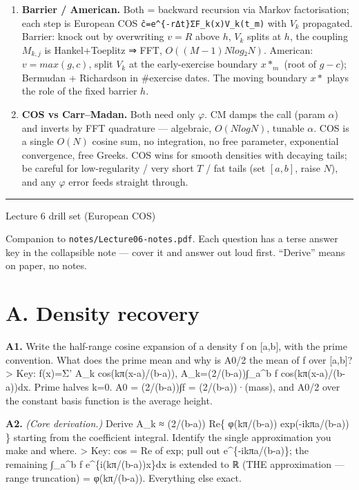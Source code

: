 \documentclass[
  11pt,
]{article}
\begin{document}
\begin{enumerate}
\item
  \textbf{Barrier / American.} Both = backward recursion via Markov
  factorisation; each step is European COS
  \texttt{ĉ=e\^{}\{-rΔt\}Σ\textquotesingle{}F\_k(x)V\_k(t\_m)} with
  \(V_k\) propagated. Barrier: knock out by overwriting \(v=R\) above
  \(h\), \(V_k\) splits at \(h\), the coupling \(M_{k,j}\) is
  Hankel+Toeplitz ⇒ FFT, \(O((M-1)N log₂N)\). American: \(v=max(g,c)\),
  split \(V_k\) at the early-exercise boundary \(x*_m\) (root of
  \(g-c\)); Bermudan + Richardson in \#exercise dates. The moving
  boundary \(x*\) plays the role of the fixed barrier \(h\).
\item
  \textbf{COS vs Carr--Madan.} Both need only \(φ\). CM damps the call
  (param \(α\)) and inverts by FFT quadrature --- algebraic,
  \(O(N log N)\), tunable \(α\). COS is a single \(O(N)\) cosine sum, no
  integration, no free parameter, exponential convergence, free Greeks.
  COS wins for smooth densities with decaying tails; be careful for
  low-regularity / very short \(T\) / fat tails (set \([a,b]\), raise
  \(N\)), and any \(φ\) error feeds straight through.
\end{enumerate}

\begin{center}\rule{0.5\linewidth}{0.5pt}\end{center}

Lecture 6 drill set (European COS)

Companion to \texttt{notes/Lecture06-notes.pdf}. Each question has a
terse answer key in the collapsible note --- cover it and answer out
loud first. ``Derive'' means on paper, no notes.

\hypertarget{a.-density-recovery}{%
\section{A. Density recovery}\label{a.-density-recovery}}

\textbf{A1.} Write the half-range cosine expansion of a density f on
{[}a,b{]}, with the prime convention. What does the prime mean and why
is A0/2 the mean of f over {[}a,b{]}? \textgreater{} Key: f(x)=Σ' A\_k
cos(kπ(x-a)/(b-a)), A\_k=(2/(b-a))∫\_a\^{}b f cos(kπ(x-a)/(b-a))dx.
Prime halves k=0. A0 = (2/(b-a))∫f = (2/(b-a))·(mass), and A0/2 over the
constant basis function is the average height.

\textbf{A2.} \emph{(Core derivation.)} Derive A\_k ≈ (2/(b-a)) Re\{
φ(kπ/(b-a)) exp(-ikπa/(b-a)) \} starting from the coefficient integral.
Identify the single approximation you make and where. \textgreater{}
Key: cos = Re of exp; pull out e\^{}\{-ikπa/(b-a)\}; the remaining
∫\_a\^{}b f e\^{}\{i(kπ/(b-a))x\}dx is extended to ℝ (THE approximation
--- range truncation) = φ(kπ/(b-a)). Everything else exact.
\end{document}
